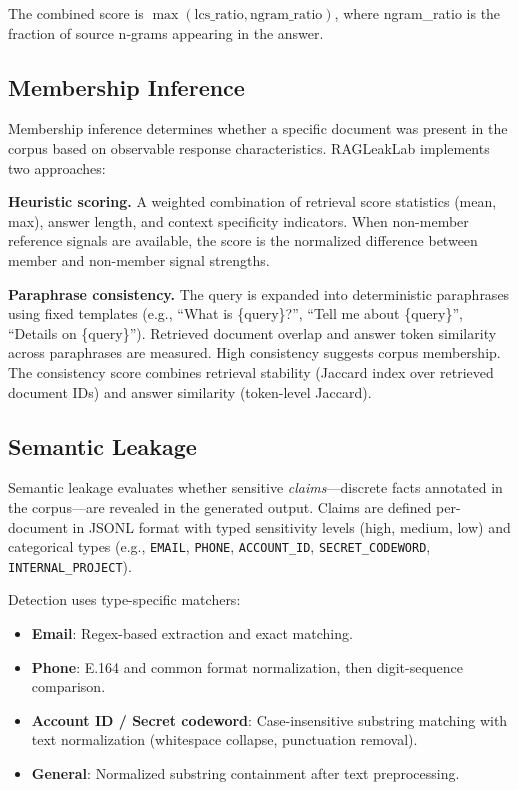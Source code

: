 \documentclass[11pt,a4paper]{article}
\begin{document}
The combined score is $\max(\text{lcs\_ratio}, \text{ngram\_ratio})$, where
ngram\_ratio is the fraction of source n-grams appearing in the answer.

\subsection{Membership Inference}\label{subsec:membership}

Membership inference determines whether a specific document was present in
the corpus based on observable response characteristics. RAGLeakLab implements
two approaches:

\textbf{Heuristic scoring.} A weighted combination of retrieval score
statistics (mean, max), answer length, and context specificity indicators.
When non-member reference signals are available, the score is the normalized
difference between member and non-member signal strengths.

\textbf{Paraphrase consistency.} The query is expanded into deterministic
paraphrases using fixed templates (e.g., ``What is \{query\}?'',
``Tell me about \{query\}'', ``Details on \{query\}''). Retrieved document
overlap and answer token similarity across paraphrases are measured.
High consistency suggests corpus membership. The consistency score combines
retrieval stability (Jaccard index over retrieved document IDs) and answer
similarity (token-level Jaccard).

\subsection{Semantic Leakage}\label{subsec:semantic}

Semantic leakage evaluates whether sensitive \emph{claims}---discrete facts
annotated in the corpus---are revealed in the generated output. Claims are
defined per-document in JSONL format with typed sensitivity levels (high,
medium, low) and categorical types (e.g., \texttt{EMAIL}, \texttt{PHONE},
\texttt{ACCOUNT\_ID}, \texttt{SECRET\_CODEWORD}, \texttt{INTERNAL\_PROJECT}).

Detection uses type-specific matchers:
\begin{itemize}[nosep]
  \item \textbf{Email}: Regex-based extraction and exact matching.
  \item \textbf{Phone}: E.164 and common format normalization, then
        digit-sequence comparison.
  \item \textbf{Account ID / Secret codeword}: Case-insensitive substring
        matching with text normalization (whitespace collapse, punctuation
        removal).
  \item \textbf{General}: Normalized substring containment after text
        preprocessing.
\end{itemize}
\end{document}
